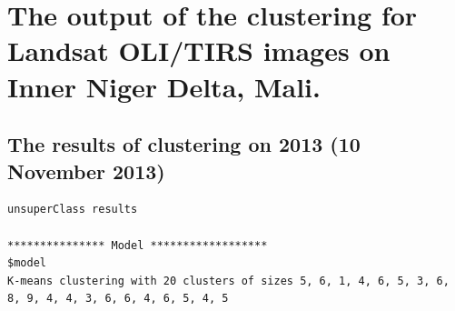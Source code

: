 \documentclass[remotesensing,article,submit,pdftex,moreauthors]{Definitions/mdpi}
\begin{document}
{} %
\appendixstart
\appendix
\section[\appendixname~\thesection]{The output of the clustering for Landsat OLI/TIRS images on Inner Niger Delta, Mali.}
\subsection[\appendixname~\thesubsection]{The results of clustering on 2013 (10 November 2013)}
\begin{scriptsize}
\begin{verbatim}
unsuperClass results

*************** Model ******************
$model
K-means clustering with 20 clusters of sizes 5, 6, 1, 4, 6, 5, 3, 6, 8, 9, 4, 4, 3, 6, 6, 4, 6, 5, 4, 5


\end{verbatim}
\end{scriptsize}
\end{document}
